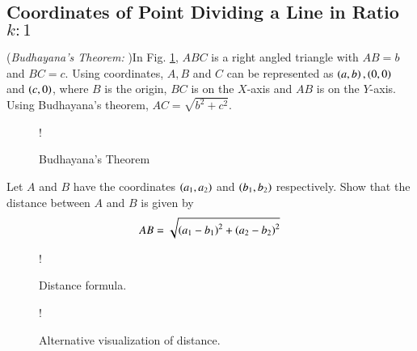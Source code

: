 \subsection{Coordinates of Point Dividing a Line in Ratio $k:1$}
\begin{definition}
({\em Budhayana's Theorem: })In Fig. \ref{fig:ch1_budhayana}, $ABC$ is a right angled triangle with $AB = b$ and $BC = c$.  Using coordinates, $A,B$ and $C$  can be represented as $\left(a,b\right), \left(0,0\right)$ and $\left(c,0\right)$, where $B$ is the origin, $BC$ is on the $X$-axis and $AB$ is on the $Y$-axis. Using Budhayana's theorem, $AC = \sqrt{b^2+c^2}$.
\end{definition}
%
\begin{figure}[!h]
\centering
\resizebox {\columnwidth} {!} {

}
\caption{Budhayana's Theorem}
\label{fig:ch1_budhayana}
\end{figure}
\begin{problem}
Let $A$ and $B$ have the coordinates $\left(a_1,a_2\right)$ and $\left(b_1,b_2\right)$ respectively.  Show that the distance between $A$ and $B$ is given by 
%
\begin{equation}
\label{eq:ch1_distance}
AB = \sqrt{\left(a_1 - b_1\right)^2 + \left(a_2 - b_2\right)^2}
\end{equation}
%
\end{problem}
%
\renewcommand{\thefigure}{\theproblem.\arabic{figure}}
\begin{figure}[!h]
\centering
\resizebox {\columnwidth} {!} {

}
\caption{Distance formula.}
\label{fig:ch1_distance}
\end{figure}
%
\renewcommand{\thefigure}{\theproblem.\arabic{figure}}
\begin{figure}[!h]
\centering
\resizebox {\columnwidth} {!} {

}
\caption{Alternative visualization of distance.}
\label{fig:ch1_distance_shift}
\end{figure}

